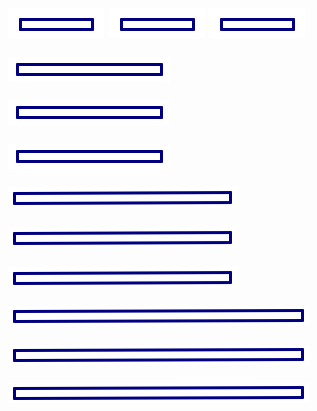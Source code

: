 \documentclass[12pt, reqno]{amsart}
\theoremstyle{remark}
\theoremstyle{definition}
\numberwithin{equation}{section}  %
\begin{document}
\begin{center}
\includegraphics{1in}
\qquad
\includegraphics{1in}
\qquad
\includegraphics{1in}

\bigskip


\includegraphics{2in}

\includegraphics{2in}

\includegraphics{2in}



\bigskip

\includegraphics{3in}

\includegraphics{3in}

\includegraphics{3in}


\bigskip

\includegraphics{4in}

\includegraphics{4in}

\includegraphics{4in}


\bigskip


\end{center}
\end{document}
